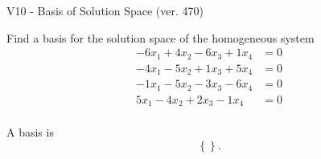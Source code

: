 \begin{exercise}
  \begin{exerciseTitle}V10 - Basis of Solution Space (ver. 470)\end{exerciseTitle}
  \begin{exerciseStatement}
    Find a basis for the solution space of the homogeneous system 
\begin{align*}
 -6 x_ 1 + 4 x_ 2 -6 x_ 3 + 1 x_ 4 &= 0  \\ 
  -4 x_ 1 -5 x_ 2 + 1 x_ 3 + 5 x_ 4 &= 0  \\ 
  -1 x_ 1 -5 x_ 2 -3 x_ 3 -6 x_ 4 &= 0  \\ 
  5 x_ 1 -4 x_ 2 + 2 x_ 3 -1 x_ 4 &= 0  \\ 
 \end{align*}


 
  \end{exerciseStatement}

  \begin{exerciseAnswer}
   A basis is   
\[\left\{\right\}.\]

  


  \end{exerciseAnswer}
\end{exercise}